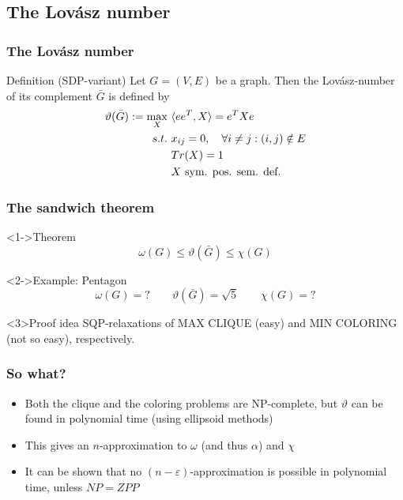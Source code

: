 \documentclass[11pt]{beamer}
\begin{document}
\subsection{The Lovász number}
\begin{frame}
	\frametitle{The Lovász number}
	\begin{block}{Definition (SDP-variant)}
		Let $G=(V,E)$ be a graph. Then the Lovász-number of its complement $\bar G$ is defined by
		\begin{equation*}
			\begin{aligned}
			\vartheta(\bar G) := \max_X \ &  \langle ee^T, X\rangle = e^TXe\\
			s.t.\ & x_{ij} = 0, \quad \forall i\neq j: (i,j)\notin E\\
			& Tr(X) = 1\\
			& X \textnormal{ sym. pos. sem. def.}
			\end{aligned}
		\end{equation*}
	\end{block}
\end{frame}

\begin{frame}\frametitle{The sandwich theorem}
    \begin{block}<1->{Theorem}
    	$$ \omega(G) \leq \vartheta(\bar G) \leq \chi(G) $$
    \end{block}
    \begin{block}<2->{Example: Pentagon}
    	$$\omega(G) = ? \qquad \vartheta(\bar G) = \sqrt 5 \qquad \chi(G)= ?$$
    \end{block}
    \begin{block}<3>{Proof idea}
    SQP-relaxations of MAX CLIQUE (easy) and MIN COLORING (not so easy), respectively.
    \end{block}

\end{frame}

\begin{frame}\frametitle{So what?}
	\begin{itemize}
		\item Both the clique and the coloring problems are NP-complete, but $\vartheta$ can be found in polynomial time (using ellipsoid methods)
		\item This gives an $n$-approximation to $\omega$ (and thus $\alpha$) and $\chi$
		\item It can be shown that no $(n-\varepsilon)$-approximation is possible in polynomial time, unless $NP=ZPP$
	\end{itemize}
    


\end{frame}
\end{document}
